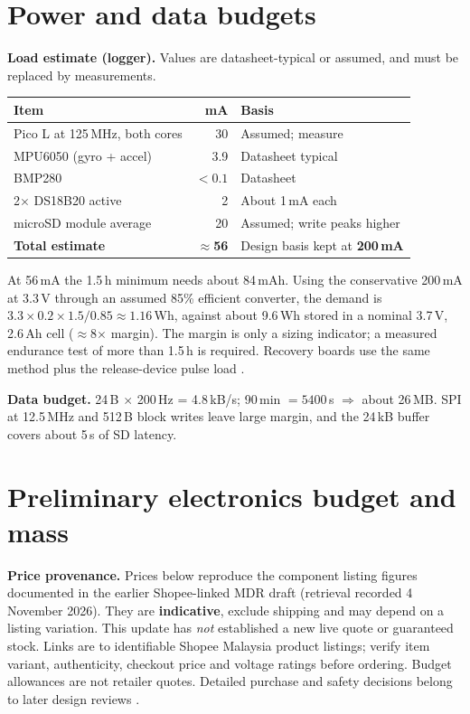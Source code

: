\section{Power and data budgets}
\label{sec:power}
\textbf{Load estimate (logger).} Values are datasheet-typical or assumed, and must be replaced by measurements.

\small
{}
\begin{tabularx}{\linewidth}{@{}L{48mm}r Y@{}}
\toprule{}\textbf{Item}&\textbf{mA}&\textbf{Basis}\\\midrule
Pico L at 125\,MHz, both cores & 30 & Assumed; measure \cite{rp2040ds}\\
MPU6050 (gyro + accel) & 3.9 & Datasheet typical \cite{mpu6050ds}\\
BMP280 & $<0.1$ & Datasheet \cite{bmp280ds}\\
2$\times$ DS18B20 active & 2 & About 1\,mA each \cite{ds18b20ds}\\
microSD module average & 20 & Assumed; write peaks higher\\
\midrule
\textbf{Total estimate} & \textbf{$\approx$56} & Design basis kept at \textbf{200\,mA}\\
\bottomrule
\end{tabularx}
\normalsize

At 56\,mA the 1.5\,h minimum \cite{rtc2027app03} needs about 84\,mAh. Using the conservative 200\,mA at 3.3\,V through an assumed 85\% efficient converter, the demand is $3.3\times0.2\times1.5/0.85\approx1.16$\,Wh, against about 9.6\,Wh stored in a nominal 3.7\,V, 2.6\,Ah cell ($\approx$8$\times$ margin). The margin is only a sizing indicator; a measured endurance test of more than 1.5\,h is required. Recovery boards use the same method plus the release-device pulse load .

\textbf{Data budget.} 24\,B $\times$ 200\,Hz = 4.8\,kB/s; 90\,min $=5400$\,s $\Rightarrow$ about 26\,MB. SPI at 12.5\,MHz and 512\,B block writes leave large margin, and the 24\,kB buffer covers about 5\,s of SD latency.


\section{Preliminary electronics budget and mass}
\label{sec:budget}
\textbf{Price provenance.} Prices below reproduce the component listing figures documented in the earlier Shopee-linked MDR draft (retrieval recorded 4 November 2026). They are \textbf{indicative}, exclude shipping and may depend on a listing variation. This update has \emph{not} established a new live quote or guaranteed stock. Links are to identifiable Shopee Malaysia product listings; verify item variant, authenticity, checkout price and voltage ratings before ordering. Budget allowances are not retailer quotes. Detailed purchase and safety decisions belong to later design reviews \cite{rtc2027app01,rtc2027app07}.

